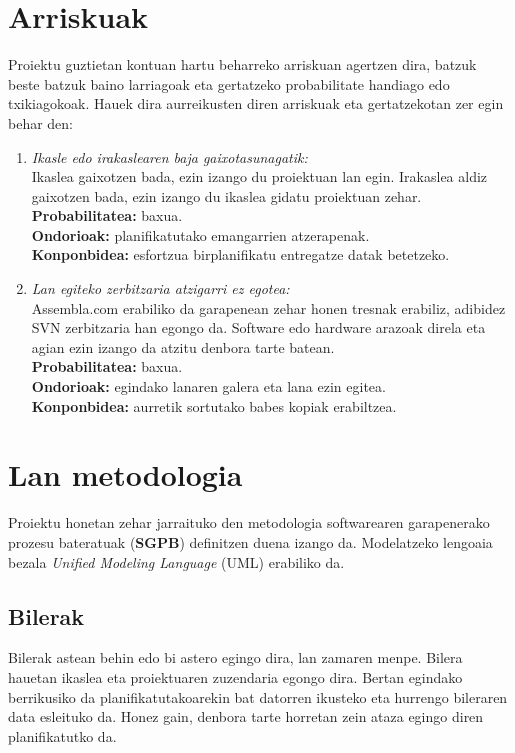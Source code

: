 \section{Arriskuak}
Proiektu guztietan kontuan hartu beharreko arriskuan agertzen dira, batzuk beste batzuk baino larriagoak eta gertatzeko probabilitate handiago edo txikiagokoak. Hauek dira aurreikusten diren arriskuak eta gertatzekotan zer egin behar den:
\begin{enumerate}

\item \textit{Ikasle edo irakaslearen baja gaixotasunagatik:}\\
Ikaslea gaixotzen bada, ezin izango du proiektuan lan egin. Irakaslea aldiz gaixotzen bada, ezin izango du ikaslea gidatu proiektuan zehar.\\
\textbf{Probabilitatea:} baxua.\\
\textbf{Ondorioak:} planifikatutako emangarrien atzerapenak.\\
\textbf{Konponbidea:} esfortzua birplanifikatu entregatze datak betetzeko.

\item \textit{Lan egiteko zerbitzaria atzigarri ez egotea:}\\
Assembla.com erabiliko da garapenean zehar honen tresnak erabiliz, adibidez SVN zerbitzaria han egongo da. Software edo hardware arazoak direla eta agian ezin izango da atzitu denbora tarte batean.\\
\textbf{Probabilitatea:} baxua.\\
\textbf{Ondorioak:} egindako lanaren galera eta lana ezin egitea.\\
\textbf{Konponbidea:} aurretik sortutako babes kopiak erabiltzea.
\end{enumerate}

\section{Lan metodologia}
Proiektu honetan zehar jarraituko den metodologia softwarearen garapenerako prozesu bateratuak (\textbf{SGPB}) definitzen duena izango da. Modelatzeko lengoaia bezala \textit{Unified Modeling Language} (UML) erabiliko da.
\subsection{Bilerak}
Bilerak astean behin edo bi astero egingo dira, lan zamaren menpe. Bilera hauetan ikaslea eta proiektuaren zuzendaria egongo dira. Bertan egindako berrikusiko da planifikatutakoarekin bat datorren ikusteko eta hurrengo bileraren data esleituko da. Honez gain, denbora tarte horretan zein ataza egingo diren planifikatutko da.
